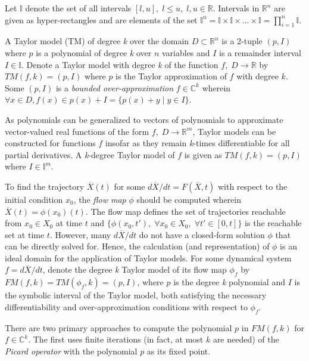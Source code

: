 Let $\mathbb{I}$ denote the set of all intervals $[l, u], \; l \leq u, \; l, u \in \mathbb{R}$. Intervals in $\mathbb{R}^n$ are given as hyper-rectangles and are elements of the set $\mathbb{I}^n = \mathbb{I} \times \mathbb{I} \times ... \times \mathbb{I} = \prod^n_{i=1} \mathbb{I}$.

A Taylor model (TM) of degree \textit{k} over the domain $D \subset \mathbb{R}^n$ is a 2-tuple $(p, I)$ where $p$ is a polynomial of degree \textit{k} over $n$ variables and $I$ is a remainder interval $I \in \mathbb{I}$. Denote a Taylor model with degree \textit{k} of the function $f, \; D \rightarrow \mathbb{R}$ by $TM(f, k) = (p, I)$ where $p$ is the Taylor approximation of $f$ with degree $k$. Some $(p, I)$ is a \textit{bounded over-approximation} $f \in \mathbb{C}^k$ wherein $\forall x \in D, f(x) \in p(x) + I = \{ p(x) + y \; | \; y \in I \}$.

As polynomials can be generalized to vectors of polynomials to approximate vector-valued real functions of the form $f, \; D \rightarrow \mathbb{R}^m$, Taylor models can be constructed for functions $f$ insofar as they remain \textit{k}-times differentiable for all partial derivatives. A \textit{k}-degree Taylor model of $f$ is given as $TM(f,k) = (p, I)$ where $I \in \mathbb{I}^m$.

To find the trajectory $\overline{X}(t)$ for some $d\overline{X} / dt = F(\overline{X}, t)$ with respect to the initial condition $x_0$, the \textit{flow map} $\phi$ should be computed wherein $\overline{X}(t) = \phi(x_0)(t)$. The flow map defines the set of trajectories reachable from $ x_0 \in X_0$ at time $t$ and ${ \{ \phi(x_0, t'), \; \forall x_0 \in X_0, \; \forall t' \in [0,t] \} }$ is the reachable set at time $t$. However, many $d\overline{X} / dt$ do not have a closed-form solution $\phi$ that can be directly solved for. Hence, the calculation (and representation) of $\phi$ is an ideal domain for the application of Taylor models. For some dynamical system $f = d\overline{X} / dt$, denote the degree \textit{k} Taylor model of its flow map $\phi_f$ by $FM(f, k) = TM(\phi_f, k) = (p, I)$, where $p$ is the degree \textit{k} polynomial and $I$ is the symbolic interval of the Taylor model, both satisfying the necessary differentiability and over-approximation conditions with respect to $\phi_f$. 

There are two primary approaches to compute the polynomial $p$ in $FM(f,k)$ for $f \in \mathbb{C}^k$. The first uses finite iterations (in fact, at most $k$ are needed) of the \textit{Picard operator} with the polynomial $p$ as its fixed point. 

